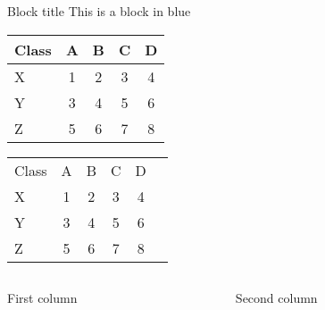 \documentclass{beamer}
\begin{document}
\begin{frame}{8}
  \hyperlink{link}{}

  \begin{block}{Block title}
This is a block in blue
\end{block}


  \end{frame}

\begin{frame}{9}
\begin{tabular}{lcccc}
  Class & A & B & C & D \\\hline
  X     & 1 & 2 & 3 & 4 \\\pause
  Y     & 3 & 4 & 5 & 6 \pause\\
  Z     &5&6&7&8
\end{tabular}
\end{frame}

\begin{frame}{10}
\begin{tabular}{lc<{\onslide<2->}c<{\onslide<3->}c<{\onslide<4->}c<{\onslide}c}
  Class & A & B & C & D \\
  X     & 1 & 2 & 3 & 4 \\
  Y     & 3 & 4 & 5 & 6 \\
  Z     &5&6&7&8
\end{tabular}
\end{frame}

\begin{frame}{11}
\begin{columns}
\begin{column}{0.5\textwidth}
First column
\end{column}
\begin{column}{0.5\textwidth}
Second column
\end{column}
\end{columns}
\end{frame}
\end{document}
